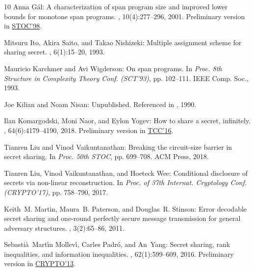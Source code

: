 \documentclass[11pt]{article}
\numberwithin{equation}{section}
\theoremstyle{definition}
\theoremstyle{plain}
\begin{document}
\begin{thebibliography}{10}
{\sc Anna G{\'{a}}l}: A characterization of span program size and improved
  lower bounds for monotone span programs.
, 10(4):277--296, 2001.
\newblock Preliminary version in
  \href{https://doi.org/10.1145/276698.276855}{STOC'98}.
\newblock [\epfmtdoi{10.1007/s000370100001}]

{\sc Mitsuru Ito, Akira Saito, and Takao Nishizeki}: Multiple assignment scheme
  for sharing secret.
, 6(1):15--20, 1993.
\newblock [\epfmtdoi{10.1007/BF02620229}]

{\sc Mauricio Karchmer and Avi Wigderson}: On span programs.
\newblock In {\em Proc. 8th Structure in Complexity Theory Conf. (SCT'93)}, pp.
  102--111. IEEE Comp. Soc., 1993.

{\sc Joe Kilian and Noam Nisan}: Unpublished.
\newblock Referenced in \cite{BeimelC94,BeimelPHD,BeimelF07,PueyoCX13}, 1990.

{\sc Ilan Komargodski, Moni Naor, and Eylon Yogev}: How to share a secret,
  infinitely.
, 64(6):4179--4190, 2018.
\newblock Preliminary version in
  \href{https://doi.org/10.1007/978-3-662-53644-5\_19}{TCC'16}.

{\sc Tianren Liu and Vinod Vaikuntanathan}: Breaking the circuit-size barrier
  in secret sharing.
\newblock In {\em Proc. 50th STOC}, pp. 699--708. ACM Press, 2018.
\newblock [\epfmtdoi{10.1145/3188745.3188936}]

{\sc Tianren Liu, Vinod Vaikuntanathan, and Hoeteck Wee}: Conditional
  disclosure of secrets via non-linear reconstruction.
\newblock In {\em Proc. of 37th Internat. Cryptology Conf. (CRYPTO'17)}, pp.
  758--790, 2017.
\newblock [\epfmtdoi{10.1007/978-3-319-63688-7\_25}]

{\sc Keith~M. Martin, Maura~B. Paterson, and Douglas~R. Stinson}: Error
  decodable secret sharing and one-round perfectly secure message transmission
  for general adversary structures.
, 3(2):65--86, 2011.
\newblock [\epfmtdoi{10.1007/s12095-010-0039-6}]

{\sc Sebasti{\`{a}}~Mart{\'{\i}}n Mollev{\'{\i}}, Carles Padr{\'{o}}, and
  An~Yang}: Secret sharing, rank inequalities, and information inequalities.
, 62(1):599--609, 2016.
\newblock Preliminary version in
  \href{http://doi.org/10.1007/978-3-642-40084-1\_16}{CRYPTO'13}.


\end{thebibliography}
\end{document}
